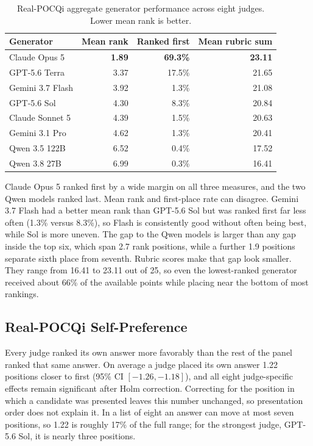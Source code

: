 \documentclass[11pt]{article}
\begin{document}
\begin{table}[htbp]
\centering
\small
\caption{Real-POCQi aggregate generator performance across eight
judges. Lower mean rank is better.}
\label{tab:real-performance}
\begin{tabular}{lrrr}
\toprule

Generator & Mean rank & Ranked first & Mean rubric sum \\
\midrule
Claude Opus 5 & \textbf{1.89} & \textbf{69.3\%} & \textbf{23.11} \\
GPT-5.6 Terra & 3.37 & 17.5\% & 21.65 \\
Gemini 3.7 Flash & 3.92 & 1.3\% & 21.08 \\
GPT-5.6 Sol & 4.30 & 8.3\% & 20.84 \\
Claude Sonnet 5 & 4.39 & 1.5\% & 20.63 \\
Gemini 3.1 Pro & 4.62 & 1.3\% & 20.41 \\
Qwen 3.5 122B & 6.52 & 0.4\% & 17.52 \\
Qwen 3.8 27B & 6.99 & 0.3\% & 16.41 \\


\bottomrule
\end{tabular}
\end{table}
\FloatBarrier

Claude Opus 5 ranked first by a wide margin on all three measures, and the two Qwen models ranked last. Mean rank and first-place rate can disagree. Gemini 3.7 Flash had a better mean rank than GPT-5.6 Sol but was ranked first far less often (1.3\% versus 8.3\%), so Flash is consistently good without often being best, while Sol is more uneven. The gap to the Qwen models is larger than any gap inside the top six, which span 2.7 rank positions, while a further 1.9 positions separate sixth place from seventh. Rubric scores make that gap look smaller. They range from 16.41 to 23.11 out of 25, so even the lowest-ranked generator received about 66\% of the available points while placing near the bottom of most rankings.



\subsection{Real-POCQi Self-Preference}


Every judge ranked its own answer more favorably than the rest of the panel ranked that same answer. On average a judge placed its own answer 1.22 positions closer to first (95\% CI $[-1.26,-1.18]$), and all eight judge-specific effects remain significant after Holm correction. Correcting for the position in which a candidate was presented leaves this number unchanged, so presentation order does not explain it. In a list of eight an answer can move at most seven positions, so 1.22 is roughly 17\% of the full range; for the strongest judge, GPT-5.6 Sol, it is nearly three positions.
\end{document}
